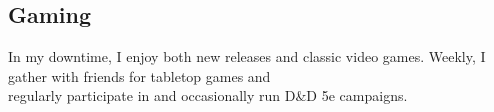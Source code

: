 \documentclass[
	10pt, %
]{FreemanCV}
\begin{document}
\begin{paracol}{2}
\subsection{Gaming}
In my downtime, I enjoy both new releases and classic video games. Weekly, I gather with friends for tabletop games and \\regularly participate in and occasionally run D\&D 5e campaigns.


\end{paracol} %

\end{document}
